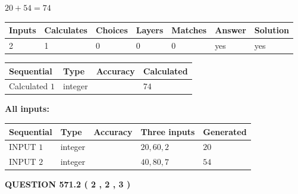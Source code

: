 \documentclass[12pt]{article}
\begin{document}
 

$ %
20 +  %
54=   %
74$
 
 
\noindent{}
 
 

 
   
   
   
   
\noindent\begin{tabular}{|l|l|l|l|l|l|l|}
 \hline
Inputs & Calculates & Choices & Layers & Matches & Answer & Solution \\ \hline
 2  & 
 1  & 
 0
  & 
 0  & 
 0  & 
  yes & 
  yes 
  \\ \hline
 \end{tabular}
   
   
   
   
\noindent{}
   
   
  
  
\noindent\begin{tabular}{|l|l|l|l|}
\hline
 Sequential & Type & Accuracy & Calculated \\ 
\hline
 
 
  Calculated $  1 $ & integer &  & 
  $ 74 $ 
 \\  \hline  
 \end{tabular}
   
   
   
   
\noindent\vspace{0.1in}\hspace{-0.08in} {\textbf{\Large{All inputs: }}}
   
   
  
  
\noindent\begin{tabular}{|l|l|l|l|l|}
\hline
 Sequential & Type & Accuracy & Three inputs & Generated \\ 
\hline
 
 
  INPUT $  1 $ & integer &  & $
 20
 , 
 60
 , 
 2
 $ & $ 20 $ 
 \\  \hline  
 
 
  INPUT $  2 $ & integer &  & $
 40
 , 
 80
 , 
 7
 $ & $ 54 $ 
 \\  \hline  
 \end{tabular}
   
   
  
\vspace{0.2in}
  
{\textbf{\Large{QUESTION
571.2 
 ( 2 , 2 , 3 )
}}}
  
\end{document}
